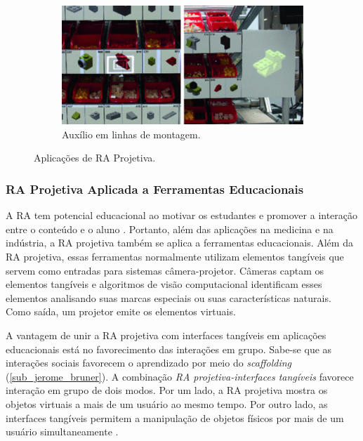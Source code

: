 \begin{figure}
\begin{subfigure}{.33\textwidth}
        \centering
        \includegraphics[width=.9\linewidth,fbox]{figs/sand.png}
        \caption{Auxílio em linhas de montagem.}
        \label{fig_sand}
    \end{subfigure}%
    \caption{Aplicações de RA Projetiva.}
    \label{fig_proj_ra_applications}
\end{figure}

\subsubsection{RA Projetiva Aplicada a Ferramentas Educacionais}
\label{sub_sub_aplicacoes_ra_projetiva_educacao}

A \ac{RA} tem potencial educacional ao motivar os estudantes e promover a interação entre o conteúdo e o aluno \cite{silva_evaluating_2013}. Portanto, além das aplicações na medicina e na indústria, a RA projetiva também se aplica a ferramentas educacionais. Além da RA projetiva, essas ferramentas normalmente utilizam elementos tangíveis que servem como entradas para sistemas câmera-projetor. Câmeras captam os elementos tangíveis e algoritmos de visão computacional identificam esses elementos analisando suas marcas especiais ou suas características naturais. Como saída, um projetor emite os elementos virtuais.

A vantagem de unir a RA projetiva com interfaces tangíveis em aplicações educacionais está no favorecimento das interações em grupo. Sabe-se que as interações sociais favorecem o aprendizado por meio do \textit{scaffolding} (\autoref{sub_jerome_bruner}). A combinação \textit{RA projetiva-interfaces tangíveis} favorece interação em grupo de dois modos. Por um lado, a RA projetiva mostra os objetos virtuais a mais de um usuário ao mesmo tempo. Por outro lado, as interfaces tangíveis permitem a manipulação de objetos físicos por mais de um usuário simultaneamente \cite{burleson_active_2018, horn_tangible_2012}.

